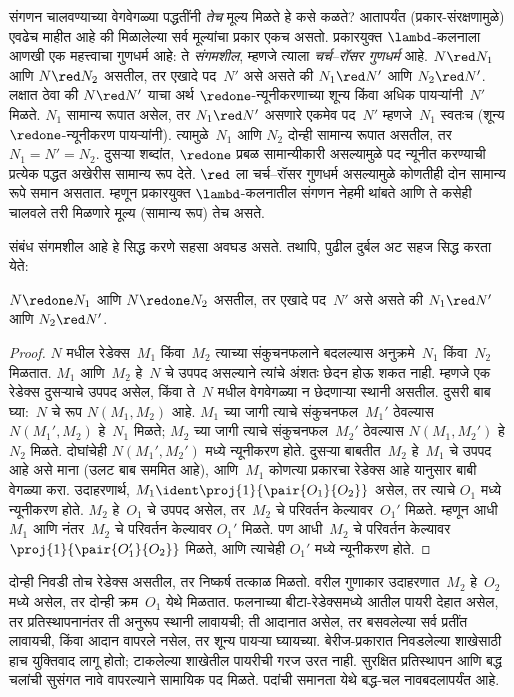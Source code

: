 \documentclass[../../../include/open-logic-section]{subfiles}
\begin{document}
संगणन चालवण्याच्या वेगवेगळ्या पद्धतींनी \emph{तेच}
मूल्य मिळते हे कसे कळते? आतापर्यंत (प्रकार-संरक्षणामुळे)
एवढेच माहीत आहे की मिळालेल्या सर्व मूल्यांचा प्रकार एकच
असतो. प्रकारयुक्त $\lambd$-कलनाला आणखी एक महत्त्वाचा
गुणधर्म आहे: ते \emph{संगमशील}, म्हणजे त्याला
\emph{चर्च–रॉसर गुणधर्म} आहे. $N \red N_1$ आणि
$N \red N_2$ असतील, तर एखादे पद~$N'$ असे असते की
$N_1 \red N'$ आणि $N_2 \red N'$. लक्षात ठेवा की
$N \red N'$ याचा अर्थ $\redone$-न्यूनीकरणाच्या
शून्य किंवा अधिक पायऱ्यांनी~$N'$ मिळते.
$N_1$ सामान्य रूपात असेल, तर $N_1 \red N'$ असणारे
एकमेव पद~$N'$ म्हणजे~$N_1$ स्वतःच (शून्य
$\redone$-न्यूनीकरण पायऱ्यांनी). त्यामुळे~$N_1$ आणि
$N_2$ दोन्ही सामान्य रूपात असतील, तर $N_1 = N' = N_2$.
दुसऱ्या शब्दांत, $\redone$ प्रबळ सामान्यीकारी असल्यामुळे
पद न्यूनीत करण्याची प्रत्येक पद्धत अखेरीस सामान्य रूप देते.
$\red$ ला चर्च–रॉसर गुणधर्म असल्यामुळे कोणतीही दोन
सामान्य रूपे समान असतात. म्हणून प्रकारयुक्त
$\lambd$-कलनातील संगणन नेहमी थांबते आणि ते कसेही
चालवले तरी मिळणारे मूल्य (सामान्य रूप) तेच असते.

संबंध संगमशील आहे हे सिद्ध करणे सहसा अवघड असते.
तथापि, पुढील दुर्बल अट सहज सिद्ध करता येते:

\begin{prop}[दुर्बल चर्च–रॉसर गुणधर्म]
$N \redone N_1$ आणि $N \redone N_2$ असतील, तर एखादे
पद~$N'$ असे असते की $N_1 \red N'$ आणि $N_2 \red N'$.
\end{prop}

\begin{proof}
  $N$ मधील रेडेक्स~$M_1$ किंवा~$M_2$ त्याच्या संकुचनफलाने
  बदलल्यास अनुक्रमे~$N_1$ किंवा~$N_2$ मिळतात.
  $M_1$ आणि~$M_2$ हे~$N$ चे उपपद असल्याने त्यांचे
  अंशतः छेदन होऊ शकत नाही. म्हणजे एक रेडेक्स दुसऱ्याचे
  उपपद असेल, किंवा ते~$N$ मधील वेगवेगळ्या न छेदणाऱ्या
  स्थानी असतील. दुसरी बाब घ्या:~$N$ चे रूप $N(M_1,M_2)$
  आहे. $M_1$ च्या जागी त्याचे संकुचनफल~$M_1'$ ठेवल्यास
  $N(M_1',M_2)$ हे~$N_1$ मिळते; $M_2$ च्या जागी त्याचे
  संकुचनफल~$M_2'$ ठेवल्यास $N(M_1,M_2')$ हे~$N_2$
  मिळते. दोघांचेही $N(M_1',M_2')$ मध्ये न्यूनीकरण होते.
  दुसऱ्या बाबतीत~$M_2$ हे~$M_1$ चे उपपद आहे असे माना
  (उलट बाब सममित आहे), आणि~$M_1$ कोणत्या प्रकारचा
  रेडेक्स आहे यानुसार बाबी वेगळ्या करा. उदाहरणार्थ,
  $M_1 \ident \proj{1}{\pair{O_1}{O_2}}$ असेल, तर त्याचे
  $O_1$ मध्ये न्यूनीकरण होते. $M_2$ हे~$O_1$ चे उपपद
  असेल, तर~$M_2$ चे परिवर्तन केल्यावर~$O_1'$ मिळते.
  म्हणून आधी~$M_1$ आणि नंतर~$M_2$ चे परिवर्तन केल्यावर
  $O_1'$ मिळते. पण आधी~$M_2$ चे परिवर्तन केल्यावर
  $\proj{1}{\pair{O_1'}{O_2}}$ मिळते, आणि त्याचेही
  $O_1'$ मध्ये न्यूनीकरण होते.
\end{proof}
दोन्ही निवडी तोच रेडेक्स असतील, तर निष्कर्ष तत्काळ
मिळतो. वरील गुणाकार उदाहरणात~$M_2$ हे~$O_2$ मध्ये
असेल, तर दोन्ही क्रम~$O_1$ येथे मिळतात. फलनाच्या
बीटा-रेडेक्समध्ये आतील पायरी देहात असेल, तर
प्रतिस्थापनानंतर ती अनुरूप स्थानी लावायची; ती आदानात
असेल, तर बसवलेल्या सर्व प्रतींत लावायची, किंवा आदान
वापरले नसेल, तर शून्य पायऱ्या घ्यायच्या. बेरीज-प्रकारात
निवडलेल्या शाखेसाठी हाच युक्तिवाद लागू होतो; टाकलेल्या
शाखेतील पायरीची गरज उरत नाही. सुरक्षित प्रतिस्थापन
आणि बद्ध चलांची सुसंगत नावे वापरल्याने सामायिक पद
मिळते. पदांची समानता येथे बद्ध-चल नावबदलापर्यंत आहे.
\end{document}
